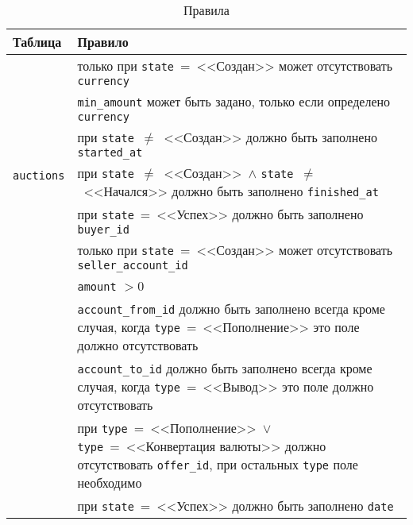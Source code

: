 \begin{table}[!th]
    \centering
    \caption{Правила}
    \label{tab:db-checks-1}
    \begin{tabular}{|p{3cm}|p{13cm}|}
         \hline
         \textbf{Таблица} & \textbf{Правило} \\
         \hline
         \multirow{7}{3cm}{\texttt{auctions}} & только при \mbox{\texttt{state}~=~<<Создан>>} может отсутствовать \texttt{currency}  \\
         \cline{2-2}
         & \texttt{min\_amount} может быть задано, только если определено \texttt{currency} \\
         \cline{2-2}
         & при \mbox{\texttt{state}~$\neq$~<<Создан>>} должно быть заполнено \texttt{started\_at} \\
         \cline{2-2}
         & при \mbox{\texttt{state}~$\neq$~<<Создан>>}~$\land$ \mbox{\texttt{state}~$\neq$~<<Начался>>} должно быть заполнено \texttt{finished\_at} \\
         \hline
         \multirow{2}{3cm}{\texttt{auctions}} & при \mbox{\texttt{state}~=~<<Успех>>} должно быть заполнено \texttt{buyer\_id} \\
         \cline{2-2}
         & только при \mbox{\texttt{state}~=~<<Создан>>} может отсутствовать \texttt{seller\_account\_id} \\
         \hline
         \multirow{10}{3cm}{\texttt{transactions}} & \texttt{amount} $> 0$ \\
         \cline{2-2}
         & \texttt{account\_from\_id} должно быть заполнено всегда кроме случая, когда \texttt{type}~=~<<Пополнение>> это поле должно отсутствовать \\
         \cline{2-2}
         & \texttt{account\_to\_id} должно быть заполнено всегда кроме случая, когда \texttt{type}~=~<<Вывод>> это поле должно отсутствовать \\
         \cline{2-2}
         & при \texttt{type}~=~<<Пополнение>>~$\lor$ \texttt{type}~=~<<Конвертация валюты>> должно отсутствовать \texttt{offer\_id}, при остальных \texttt{type} поле необходимо \\
         \cline{2-2}
         & при \texttt{state}~=~<<Успех>> должно быть заполнено \texttt{date} \\
         \hline
    \end{tabular}
\end{table}

